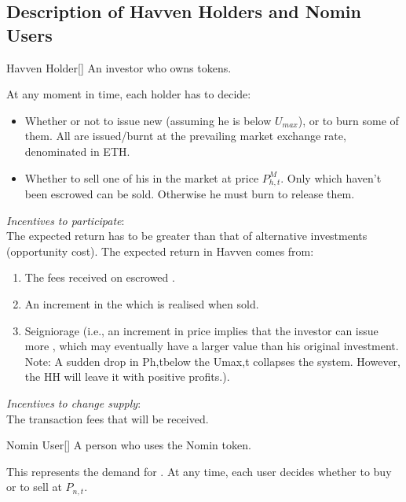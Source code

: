 \newpage

\subsection{Description of Havven Holders and Nomin Users}
\begin{namedthm}{Havven Holder}[]
An investor who owns \HAV{} tokens.
\end{namedthm}

\noindent At any moment in time, each holder has to decide:
\begin{itemize}
\item{Whether or not to issue new \NOM{} (assuming he is below $U_{max}$), or to burn some of them. All \NOM{} are issued/burnt at the prevailing market exchange rate, denominated in ETH.}
\item{Whether to sell one of his \HAV{} in the market at price $P^M_{h,t}$. Only \HAV{} which haven't been escrowed can be sold. Otherwise he must burn \NOM{} to release them. }
\end{itemize}

\noindent \emph{Incentives to participate}: \\
\noindent The expected return has to be greater than that of alternative investments (opportunity cost). The expected return in Havven comes from:
\begin{enumerate}
\item{The fees received on escrowed \HAV{}.}
\item{An increment in the \HAV{} which is realised when sold.}
\item{Seigniorage (i.e., an increment in \HAV{} price implies that the investor can issue more \NOM{}, which may eventually have a larger value than his original investment. Note: A sudden drop in Ph,tbelow the Umax,t collapses the system. However, the HH will leave it with positive profits.).}
\end{enumerate}
 
\noindent \emph{Incentives to change supply}:\\
\noindent The transaction fees that will be received. 

\begin{namedthm}{Nomin User}[]
A person who uses the Nomin token.
\end{namedthm}

\noindent This represents the demand for \NOM{}. At any time, each user decides whether to buy or to sell \NOM{} at $P_{n,t}$. \\
 
